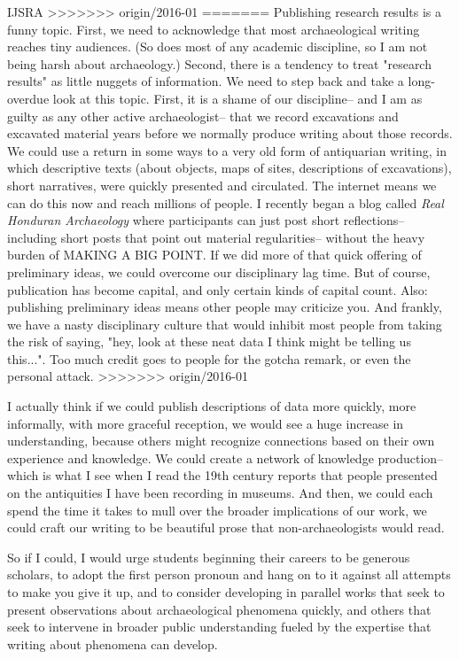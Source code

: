 \begin{labeling}{IJSRA}
>>>>>>> origin/2016-01
=======
Publishing research results is a funny topic. First, we need to acknowledge that most archaeological writing reaches tiny audiences. (So does most of any academic discipline, so I am not being harsh about archaeology.) Second, there is a tendency to treat "research results" as little nuggets of information. We need to step back and take a long-overdue look at this topic. First, it is a shame of our discipline-- and I am as guilty as any other active archaeologist-- that we record excavations and excavated material years before we normally produce writing about those records. We could use a return in some ways to a very old form of antiquarian writing, in which descriptive texts (about objects, maps of sites, descriptions of excavations), short narratives, were quickly presented and circulated. The internet means we can do this now and reach millions of people. I recently began a blog called \textit{Real Honduran Archaeology} where participants can just post short reflections-- including short posts that point out material regularities-- without the heavy burden of {\scshape MAKING A BIG POINT}. If we did more of that quick offering of preliminary ideas, we could overcome our disciplinary lag time. But of course, publication has become capital, and only certain kinds of capital count. Also: publishing preliminary ideas means other people may criticize you. And frankly, we have a nasty disciplinary culture that would inhibit most people from taking the risk of saying, "hey, look at these neat data I think might be telling us this...". Too much credit goes to people for the gotcha remark, or even the personal attack. 
>>>>>>> origin/2016-01

I actually think if we could publish descriptions of data more quickly, more informally, with more graceful reception, we would see a huge increase in understanding, because others might recognize connections based on their own experience and knowledge. We could create a network of knowledge production-- which is what I see when I read the 19th century reports that people presented on the antiquities I have been recording in museums. And then, we could each spend the time it takes to mull over the broader implications of our work, we could craft our writing to be beautiful prose that non-archaeologists would read.

So if I could, I would urge students beginning their careers to be generous scholars, to adopt the first person pronoun and hang on to it against all attempts to make you give it up, and to consider developing in parallel works that seek to present observations about archaeological phenomena quickly, and others that seek to intervene in broader public understanding fueled by the expertise that writing about phenomena can develop.


\end{labeling}

